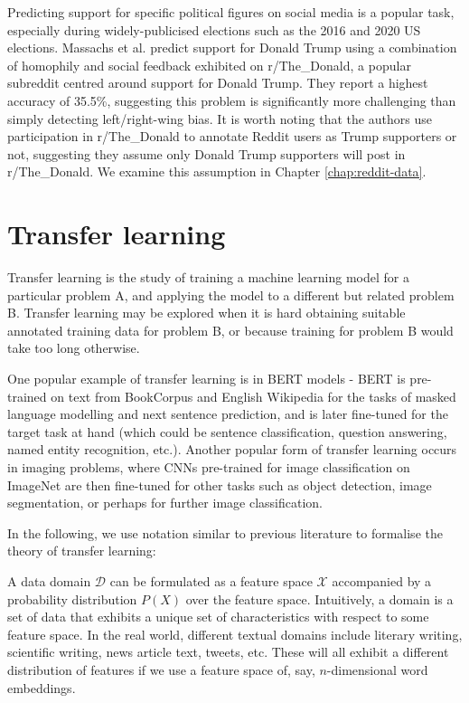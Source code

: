 Predicting support for specific political figures on social media is a popular task, especially during widely-publicised elections such as the 2016 and 2020 US elections. Massachs et al. \cite{massachs} predict support for Donald Trump using a combination of homophily and social feedback exhibited on r/The\_Donald, a popular subreddit centred around support for Donald Trump. They report a highest accuracy of 35.5\%, suggesting this problem is significantly more challenging than simply detecting left/right-wing bias. It is worth noting that the authors use participation in r/The\_Donald to annotate Reddit users as Trump supporters or not, suggesting they assume only Donald Trump supporters will post in r/The\_Donald. We examine this assumption in Chapter \ref{chap:reddit-data}.

\section{Transfer learning} \label{sec:transfer-learning}

Transfer learning is the study of training a machine learning model for a particular problem A, and applying the model to a different but related problem B. Transfer learning may be explored when it is hard obtaining suitable annotated training data for problem B, or because training for problem B would take too long otherwise.

One popular example of transfer learning is in BERT models - BERT is pre-trained on text from BookCorpus and English Wikipedia \cite{bert} for the tasks of masked language modelling and next sentence prediction, and is later fine-tuned for the target task at hand (which could be sentence classification, question answering, named entity recognition, etc.). Another popular form of transfer learning occurs in imaging problems, where CNNs pre-trained for image classification on ImageNet are then fine-tuned for other tasks such as object detection, image segmentation, or perhaps for further image classification.

In the following, we use notation similar to previous literature \cite{ruder} \cite{pan-survey} to formalise the theory of transfer learning:

A data domain $ \mathcal{D} $ can be formulated as a feature space $ \mathcal{X} $ accompanied by a probability distribution $ P(X) $ over the feature space. Intuitively, a domain is a set of data that exhibits a unique set of characteristics with respect to some feature space. In the real world, different textual domains include literary writing, scientific writing, news article text, tweets, etc. These will all exhibit a different distribution of features if we use a feature space of, say, $n$-dimensional word embeddings.

